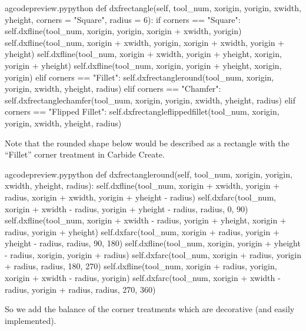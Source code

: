 \documentclass{ltxdoc}
\begin{document}
\lstset{firstnumber=\thegcpy}
\begin{writecode}{a}{gcodepreview.py}{python}
    def dxfrectangle(self, tool_num, xorigin, yorigin, xwidth, yheight, corners = "Square", radius = 6):
        if corners == "Square":
            self.dxfline(tool_num, xorigin, yorigin, xorigin + xwidth, yorigin)
            self.dxfline(tool_num, xorigin + xwidth, yorigin, xorigin + xwidth, yorigin + yheight)
            self.dxfline(tool_num, xorigin + xwidth, yorigin + yheight, xorigin, yorigin + yheight)
            self.dxfline(tool_num, xorigin, yorigin + yheight, xorigin, yorigin)
        elif corners == "Fillet":
            self.dxfrectangleround(tool_num, xorigin, yorigin, xwidth, yheight, radius)
        elif corners == "Chamfer":
            self.dxfrectanglechamfer(tool_num, xorigin, yorigin, xwidth, yheight, radius)
        elif corners == "Flipped Fillet":
            self.dxfrectangleflippedfillet(tool_num, xorigin, yorigin, xwidth, yheight, radius)

\end{writecode}
\addtocounter{gcpy}{13}

Note that the rounded shape below would be described as a rectangle with the ``Fillet'' corner treatment in Carbide Create.

\lstset{firstnumber=\thegcpy}
\begin{writecode}{a}{gcodepreview.py}{python}
    def dxfrectangleround(self, tool_num, xorigin, yorigin, xwidth, yheight, radius):
        self.dxfline(tool_num,  xorigin + xwidth, yorigin + radius, xorigin + xwidth, yorigin + yheight - radius)
        self.dxfarc(tool_num, xorigin + xwidth - radius, yorigin + yheight - radius, radius,  0, 90)
        self.dxfline(tool_num,  xorigin + xwidth - radius, yorigin + yheight, xorigin + radius, yorigin + yheight)
        self.dxfarc(tool_num, xorigin + radius, yorigin + yheight - radius, radius, 90, 180)
        self.dxfline(tool_num,  xorigin, yorigin + yheight - radius, xorigin, yorigin + radius)
        self.dxfarc(tool_num, xorigin + radius, yorigin + radius, radius, 180, 270)
        self.dxfline(tool_num,  xorigin + radius, yorigin, xorigin + xwidth - radius, yorigin)
        self.dxfarc(tool_num, xorigin + xwidth - radius, yorigin + radius, radius, 270, 360)

\end{writecode}
\addtocounter{gcpy}{11}

\noindent So we add the balance of the corner treatments which are decorative (and easily implemented). 
\end{document}
